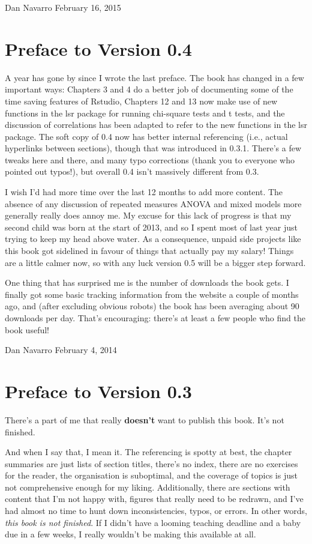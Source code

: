 \documentclass[
]{book}
\begin{document}
Dan Navarro
February 16, 2015

\hypertarget{preface-to-version-0.4}{%
\section{Preface to Version 0.4}\label{preface-to-version-0.4}}

A year has gone by since I wrote the last preface. The book has changed in a few important ways: Chapters 3 and 4 do a better job of documenting some of the time saving features of Rstudio, Chapters 12 and 13 now make use of new functions in the lsr package for running chi-square tests and t tests, and the discussion of correlations has been adapted to refer to the new functions in the lsr package. The soft copy of 0.4 now has better internal referencing (i.e., actual hyperlinks between sections), though that was introduced in 0.3.1. There's a few tweaks here and there, and many typo corrections (thank you to everyone who pointed out typos!), but overall 0.4 isn't massively different from 0.3.

I wish I'd had more time over the last 12 months to add more content. The absence of any discussion of repeated measures ANOVA and mixed models more generally really does annoy me. My excuse for this lack of progress is that my second child was born at the start of 2013, and so I spent most of last year just trying to keep my head above water. As a consequence, unpaid side projects like this book got sidelined in favour of things that actually pay my salary! Things are a little calmer now, so with any luck version 0.5 will be a bigger step forward.

One thing that has surprised me is the number of downloads the book gets. I finally got some basic tracking information from the website a couple of months ago, and (after excluding obvious robots) the book has been averaging about 90 downloads per day. That's encouraging: there's at least a few people who find the book useful!

Dan Navarro
February 4, 2014

\hypertarget{preface-to-version-0.3}{%
\section{Preface to Version 0.3}\label{preface-to-version-0.3}}

There's a part of me that really \textbf{doesn't} want to publish this book. It's not finished.

And when I say that, I mean it. The referencing is spotty at best, the chapter summaries are just lists of section titles, there's no index, there are no exercises for the reader, the organisation is suboptimal, and the coverage of topics is just not comprehensive enough for my liking. Additionally, there are sections with content that I'm not happy with, figures that really need to be redrawn, and I've had almost no time to hunt down inconsistencies, typos, or errors. In other words, \emph{this book is not finished}. If I didn't have a looming teaching deadline and a baby due in a few weeks, I really wouldn't be making this available at all.
\end{document}
